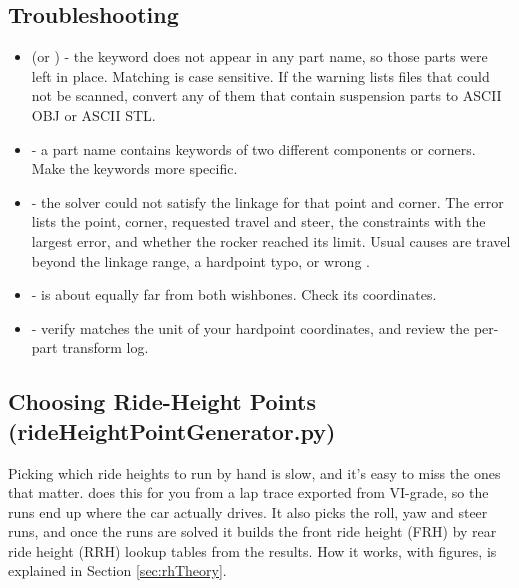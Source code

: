 \subsection{Troubleshooting}
\begin{itemize}
    \item {} (or ) - the keyword does not appear in any part name, so those parts were left in place. Matching is case sensitive. If the warning lists files that could not be scanned, convert any of them that contain suspension parts to ASCII OBJ or ASCII STL.

    \item {} - a part name contains keywords of two different components or corners. Make the keywords more specific.

    \item {} - the solver could not satisfy the linkage for that point and corner. The error lists the point, corner, requested travel and steer, the constraints with the largest error, and whether the rocker reached its limit. Usual causes are travel beyond the linkage range, a hardpoint typo, or wrong .

    \item {} -  is about equally far from both wishbones. Check its coordinates.

    \item {} - verify  matches the unit of your hardpoint coordinates, and review the per-part transform log.
\end{itemize}

\subsection{Choosing Ride-Height Points (rideHeightPointGenerator.py)}
Picking which ride heights to run by hand is slow, and it's easy to miss the ones that matter.  does this for you from a lap trace exported from VI-grade, so the runs end up where the car actually drives. It also picks the roll, yaw and steer runs, and once the runs are solved it builds the front ride height (FRH) by rear ride height (RRH) lookup tables from the results. How it works, with figures, is explained in Section \ref{sec:rhTheory}.

